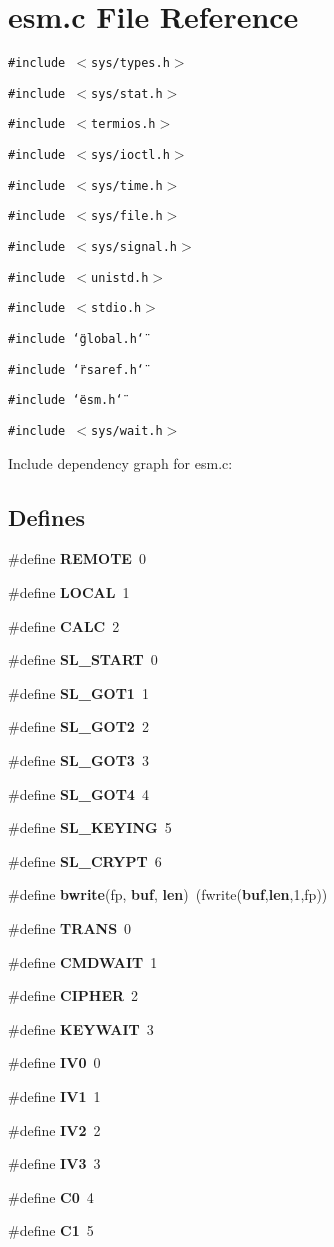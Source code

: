 \section{esm.c File Reference}
\label{esm_8c}


{\tt \#include $<$sys/types.h$>$}\par
{\tt \#include $<$sys/stat.h$>$}\par
{\tt \#include $<$termios.h$>$}\par
{\tt \#include $<$sys/ioctl.h$>$}\par
{\tt \#include $<$sys/time.h$>$}\par
{\tt \#include $<$sys/file.h$>$}\par
{\tt \#include $<$sys/signal.h$>$}\par
{\tt \#include $<$unistd.h$>$}\par
{\tt \#include $<$stdio.h$>$}\par
{\tt \#include \char`\"{}global.h\char`\"{}}\par
{\tt \#include \char`\"{}rsaref.h\char`\"{}}\par
{\tt \#include \char`\"{}esm.h\char`\"{}}\par
{\tt \#include $<$sys/wait.h$>$}\par


Include dependency graph for esm.c:\subsection*{Defines}
\begin{CompactItemize}
\item 
\#define {\bf REMOTE}\ 0
\item 
\#define {\bf LOCAL}\ 1
\item 
\#define {\bf CALC}\ 2
\item 
\#define {\bf SL\_\-START}\ 0
\item 
\#define {\bf SL\_\-GOT1}\ 1
\item 
\#define {\bf SL\_\-GOT2}\ 2
\item 
\#define {\bf SL\_\-GOT3}\ 3
\item 
\#define {\bf SL\_\-GOT4}\ 4
\item 
\#define {\bf SL\_\-KEYING}\ 5
\item 
\#define {\bf SL\_\-CRYPT}\ 6
\item 
\#define {\bf bwrite}(fp, {\bf buf}, {\bf len})\ (fwrite({\bf buf},{\bf len},1,fp))
\item 
\#define {\bf TRANS}\ 0
\item 
\#define {\bf CMDWAIT}\ 1
\item 
\#define {\bf CIPHER}\ 2
\item 
\#define {\bf KEYWAIT}\ 3
\item 
\#define {\bf IV0}\ 0
\item 
\#define {\bf IV1}\ 1
\item 
\#define {\bf IV2}\ 2
\item 
\#define {\bf IV3}\ 3
\item 
\#define {\bf C0}\ 4
\item 
\#define {\bf C1}\ 5
\end{CompactItemize}
